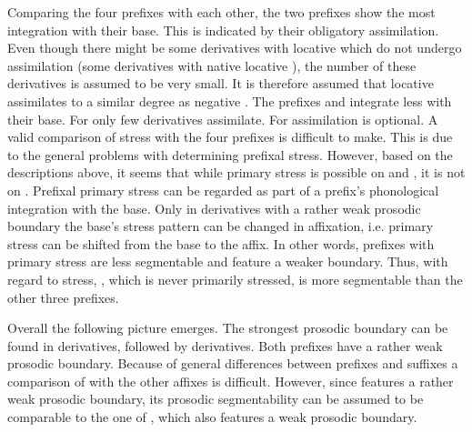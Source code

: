 Comparing the four prefixes with each other, the two prefixes show the most integration with their base. This is indicated by their obligatory assimilation. Even though there might be some derivatives with locative  which do not undergo assimilation (some derivatives with native locative ), the number of these derivatives is assumed to be very small. It is therefore assumed that locative  assimilates to a similar degree as negative . The prefixes  and  integrate less with their base. For  only few derivatives assimilate. For  assimilation is optional. 
A valid comparison of stress with the four prefixes is difficult to make. This is due to the general problems with determining prefixal stress.  However, based on the descriptions above, it seems that while primary stress is possible on  and , it is not on . Prefixal primary stress can be regarded as part of a prefix's phonological integration with the base. Only in derivatives with a rather weak prosodic boundary the base's stress pattern can be changed in affixation, i.e. primary stress can be shifted from the base to the affix. In other words, prefixes with primary stress are less segmentable and feature a weaker boundary. Thus, with regard to stress, , which is never primarily stressed, is more segmentable than the other three prefixes.

Overall the following picture emerges. The strongest prosodic boundary can be found in derivatives, followed by derivatives. Both prefixes have a rather weak prosodic boundary. Because of general differences between prefixes and suffixes a comparison of  with the other affixes is difficult. However, since  features a rather weak prosodic boundary, its prosodic segmentability can be assumed to be comparable to the one of , which also features a weak prosodic boundary.



